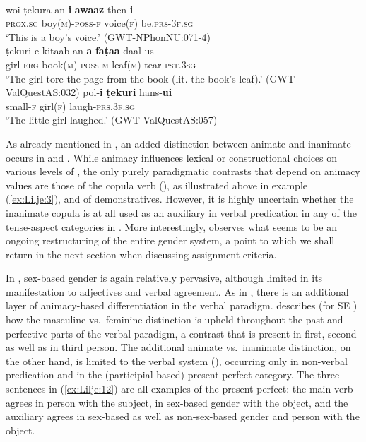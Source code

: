 \documentclass[output=collectionpaper]{langsci/langscibook}
\begin{document}
\ea
\label{ex:Lilje:11}
\\
\begin{xlist}
\ex
\gll woi ṭekura-an-\textbf{i} \textbf{awaaz} then-\textbf{i}\\
\textsc{prox.sg} boy(\textsc{m})-\textsc{poss-f} voice(\textsc{f}) be.\textsc{prs-3f.sg}    \\
\glt `This is a boy's voice.' (GWT-NPhonNU:071-4)\\
\ex
\gll ṭekuri-e kitaab-an-\textbf{a} \textbf{faṭaa} daal{}-us\\
girl-\textsc{erg} book(\textsc{m})-\textsc{poss-m} leaf(\textsc{m}) tear-\textsc{pst.3sg}    \\
\glt `The girl tore the page from the book (lit. the book's leaf).' (GWT-ValQuestAS:032)
\ex
\gll pol-\textbf{i} \textbf{ṭekuri} hans-\textbf{ui}\\
small-\textsc{f} girl(\textsc{f}) laugh-\textsc{prs.3f.sg}     \\
\glt `The little girl laughed.' (GWT-ValQuestAS:057)\\
\end{xlist}
\z

As already mentioned in , an added distinction between animate and inanimate occurs in  and . While animacy influences lexical or constructional choices on various levels of , the only purely paradigmatic contrasts that depend on animacy values are those of the copula verb (\citealt[121--125]{Perder2013}), as illustrated above in example (\ref{ex:Lilje:3}), and of demonstratives. However, it is highly uncertain whether the inanimate copula is at all used as an auxiliary in verbal predication in any of the tense-aspect categories in . More interestingly, \citet[51--55]{Perder2013} observes what seems to be an ongoing restructuring of the entire gender system, a point to which we shall return in the next section when discussing assignment criteria.

In , sex-based gender is again relatively pervasive, although limited in its manifestation to adjectives and verbal agreement. As in , there is an additional layer of animacy-based differentiation in the verbal paradigm. \citet[255]{Lehr2014} describes (for SE ) how the masculine vs.\ feminine distinction is upheld throughout the past and perfective parts of the verbal paradigm, a contrast that is present in first, second as well as in third person. The additional animate vs.\ inanimate distinction, on the other hand, is limited to the verbal system (\citeyear[256--257]{Lehr2014}), occurring only in non-verbal predication and in the (participial-based) present perfect category. The three sentences in (\ref{ex:Lilje:12}) are all examples of the present perfect: the main verb agrees in person with the subject, in sex-based gender with the object, and the auxiliary agrees in sex-based as well as non-sex-based gender and person with the object.
\end{document}

